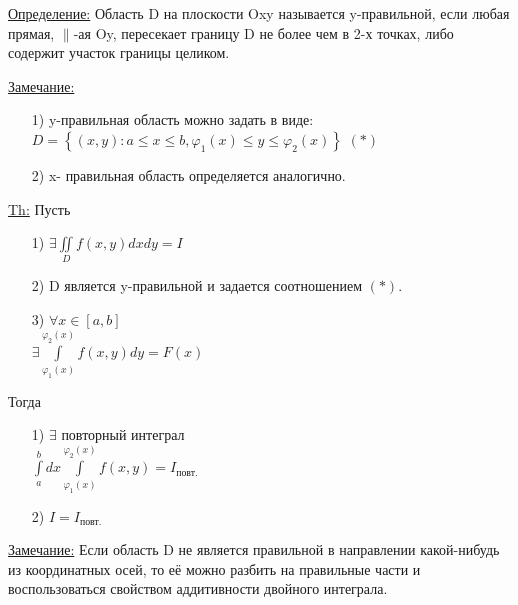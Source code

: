 
\underline{Определение:} Область D на плоскости Oxy называется y-правильной, если любая прямая, $\parallel$-ая Oy, пересекает границу D не более чем в 2-х точках, либо содержит участок границы целиком.

\underline{Замечание:} \\
\begin{enumerate}
	\item[1)] 
	y-правильная область можно задать в виде: \\
	$D = \left\{ \left(x,y\right): a \leqslant x \leqslant b, \varphi_1(x) \leqslant y \leqslant \varphi_2(x) \right\}$ $(*)$ \\
	
	\item[2)]
	x- правильная область определяется аналогично.
\end{enumerate}


\underline{Th:} Пусть \\
\begin{enumerate}
	\item[1)]
	$\exists \iint\limits_{D} f(x,y) dxdy = I$
	
	\item[2)]
	D является y-правильной и задается соотношением  $(*)$.
	
	\item[3)]
	$\forall x \in [a,b]$ \\
	$\exists \int\limits_{\varphi_1(x)}^{\varphi_2(x)} f(x,y) dy = F(x)$
\end{enumerate}

Тогда 
\begin{enumerate}
	\item[1)] 
	$\exists$ повторный интеграл \\
	$\int\limits_{a}^{b} dx \int\limits_{\varphi_1(x)}^{\varphi_2(x)} f(x,y) = I_\text{повт.}$
	
	\item[2)]
	$I = I_\text{повт.}$
\end{enumerate}


\underline{Замечание:} Если область D не является правильной в направлении какой-нибудь из координатных осей, то её можно разбить на правильные части и воспользоваться свойством аддитивности двойного интеграла.














